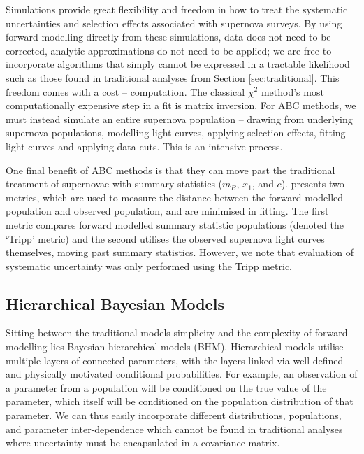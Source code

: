 \documentclass[a4paper,fleqn,usenatbib]{mnras}
\newcommand{\green}{\color{forestgreen}}
\begin{document}
Simulations provide great flexibility and freedom in how to treat the systematic uncertainties and selection effects associated with supernova surveys. By using forward modelling directly from these simulations, data does not need to be corrected, analytic approximations do not need to be applied; we are free to incorporate algorithms that simply cannot be expressed in a tractable likelihood such as those found in traditional analyses from Section \ref{sec:traditional}. This freedom comes with a cost -- computation. The classical $\chi^2$ method's most computationally expensive step in a fit is matrix inversion. For ABC methods, we must instead simulate an entire supernova population -- drawing from underlying supernova populations, modelling light curves, applying selection effects, fitting light curves and applying data cuts. This is an intensive process.

One final benefit of ABC methods is that they can move past the traditional treatment of supernovae with summary statistics ($m_B$, $x_1$, and $c$). \citet{Jennings2016} presents two metrics, which are used to measure the distance between the forward modelled population and observed population, and are minimised in fitting. The first metric compares forward modelled summary statistic populations (denoted the `Tripp' metric) and the second utilises the observed supernova light curves themselves, moving past summary statistics. However, we note that evaluation of systematic uncertainty was only performed using the Tripp metric.

\subsection{Hierarchical Bayesian Models}

Sitting between the traditional models simplicity and the complexity of forward modelling lies Bayesian hierarchical models (BHM). Hierarchical models utilise multiple layers of connected parameters, with the layers linked via well defined and {\green physically} motivated conditional probabilities. For example, an observation of a parameter from a population will be conditioned on the true value of the parameter, which itself will be conditioned on the population distribution of that parameter. We can thus easily incorporate different distributions, populations, and parameter inter-dependence which cannot be found in traditional analyses where uncertainty must be encapsulated in a covariance matrix.
\end{document}
